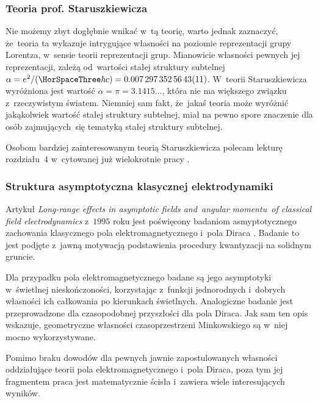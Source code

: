 \documentclass[10pt,t]{beamer}
\begin{document}
\begin{frame}
  \frametitle{Teoria prof. Staruszkiewicza}


  Nie możemy zbyt dogłębnie wnikać w~tą teorię, warto jednak zaznaczyć,
  że~teoria ta wykazuje intrygujące własności na poziomie reprezentacji
  grupy Lorentza, w~sensie teorii reprezentacji grup. Mianowicie własności
  pewnych jej reprezentacji, zależą od~wartości stałej struktury subtelnej
  $\alpha = e^{ 2 } / ( \HorSpaceThree \hbar c ) =
  0.007 \, 297 \, 352 \, 56 \, 43(11)$. W~teorii Staruszkiewicza
  wyróżniona jest wartość $\alpha = \pi = 3.1415\ldots$, która nie ma większego związku
  z~rzeczywistym światem. Niemniej sam fakt, że~jakaś teoria może wyróżnić
  jakąkolwiek wartość stałej struktury subtelnej, miał na pewno spore
  znaczenie dla osób zajmujących~się tematyką stałej struktury subtelnej.

  Osobom bardziej zainteresowanym teorią Staruszkiewicza polecam lekturę
  rozdziału~$4$ w~cytowanej już wielokrotnie pracy
  \parencite{Herdegen-Infrared-structure-beyond-locality-ETC-Ver-2024}.

\end{frame}





\begin{frame}
  \frametitle{Struktura asymptotyczna klasycznej elektrodynamiki}


  Artykuł 
  {\textit{Long-range effects in asymptotic fields and~angular momentu~of
      classical field electrodynamics}} z~$1995$ roku jest poświęcony
  badaniom asmyptotycznego zachowania klasycznego pola elektromagnetycznego
  i~pola Diraca
  \parencite{Herdegen-Long-range-effects-in-asymptotic-ETC-Pub-1995}.
  Badanie to jest podjęte z~jawną motywacją podstawienia procedury
  kwantyzacji na solidnym gruncie.

  Dla przypadku pola elektromagnetycznego badane są jego asymptotyki
  w~świetlnej nieskończoności, korzystając z~funkcji jednorodnych i~dobrych
  własności ich całkowania po kierunkach świetlnych. Analogiczne badanie
  jest przeprowadzone dla czasopodobnej przyszłości dla pola Diraca. Jak
  sam ten opis wskazuje, geometryczne własności czasoprzestrzeni
  Minkowskiego są w~niej mocno wykorzystywane.

  Pomimo braku dowodów dla pewnych jawnie zapostulowanych własności
  oddziałujące teorii pola elektromagnetycznego i~pola Diraca, poza tym jej
  fragmentem praca jest matematycznie ścisła i~zawiera wiele interesujących
  wyników.

\end{frame}
\end{document}
